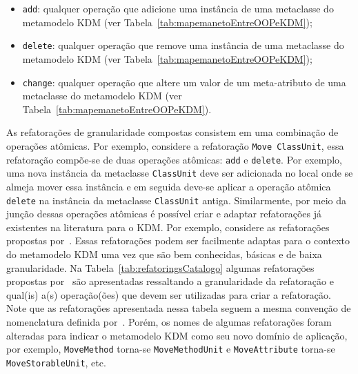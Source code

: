 
\begin{itemize}
\item \texttt{add}: qualquer operação que adicione uma instância de uma metaclasse do metamodelo KDM (ver Tabela~\ref{tab:mapemanetoEntreOOPeKDM});
\item \texttt{delete}: qualquer operação que remove uma instância de uma metaclasse do metamodelo KDM (ver Tabela~\ref{tab:mapemanetoEntreOOPeKDM});
\item \texttt{change}: qualquer operação que altere um valor de um meta-atributo de uma metaclasse do metamodelo KDM (ver Tabela~\ref{tab:mapemanetoEntreOOPeKDM}).
\end{itemize}

As refatorações de granularidade compostas consistem em uma combinação de operações atômicas. Por exemplo, considere a refatoração \texttt{Move ClassUnit}, essa refatoração compõe-se de duas operações atômicas: \texttt{add} e \texttt{delete}. Por exemplo, uma nova instância da metaclasse \texttt{ClassUnit} deve ser adicionada no local onde se almeja mover essa instância e em seguida deve-se aplicar a operação atômica \texttt{delete} na instância da metaclasse \texttt{ClassUnit} antiga. Similarmente, por meio da junção dessas operações atômicas é possível criar e adaptar refatorações já existentes na literatura para o KDM. Por exemplo, considere as refatorações propostas por~. Essas refatorações podem ser facilmente adaptas para o contexto do metamodelo KDM uma vez que são bem conhecidas, básicas e de baixa granularidade. Na Tabela~\ref{tab:refatoringsCatalogo} algumas refatorações propostas por~ são apresentadas ressaltando a granularidade da refatoração e qual(is) a(s) operação(ões) que devem ser utilizadas para criar a refatoração. Note que as refatorações apresentada nessa tabela seguem a mesma convenção de nomenclatura definida por~. Porém, os nomes de algumas refatorações foram alteradas para indicar o metamodelo KDM como seu novo domínio de aplicação, por exemplo, \texttt{MoveMethod} torna-se \texttt{MoveMethodUnit} e \texttt{MoveAttribute} torna-se \texttt{MoveStorableUnit}, etc.


